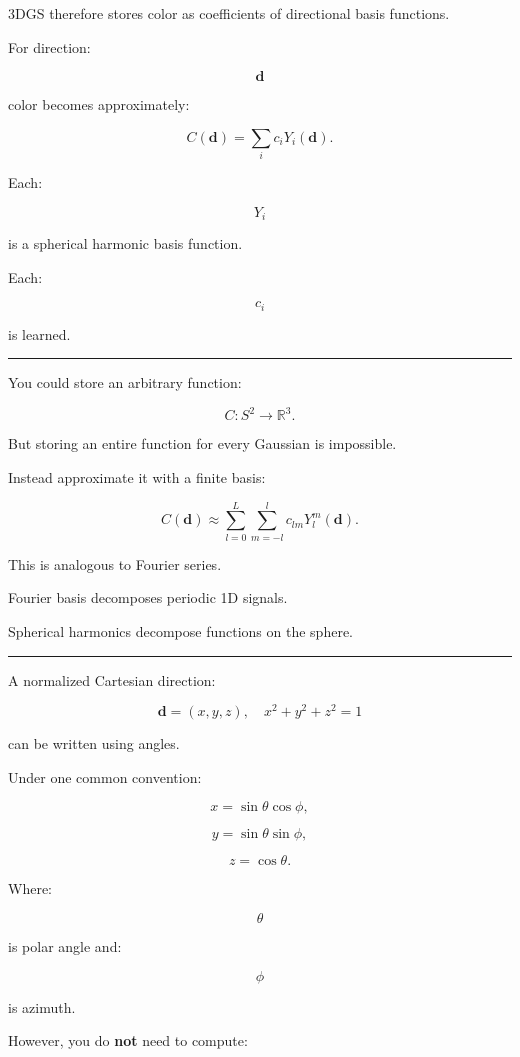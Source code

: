 3DGS therefore stores color as coefficients of directional basis functions.

For direction:

\[
\mathbf d
\]

color becomes approximately:

\[
\boxed{
C(\mathbf d)
=
\sum_i
c_iY_i(\mathbf d).
}
\]

Each:

\[
Y_i
\]

is a spherical harmonic basis function.

Each:

\[
c_i
\]

is learned.

\begin{center}\rule{0.5\linewidth}{0.5pt}\end{center}

You could store an arbitrary function:

\[
C:S^2\rightarrow\mathbb R^3.
\]

But storing an entire function for every Gaussian is impossible.

Instead approximate it with a finite basis:

\[
C(\mathbf d)
\approx
\sum_{l=0}^{L}
\sum_{m=-l}^{l}
c_{lm}
Y_l^m(\mathbf d).
\]

This is analogous to Fourier series.

Fourier basis decomposes periodic 1D signals.

Spherical harmonics decompose functions on the sphere.

\begin{center}\rule{0.5\linewidth}{0.5pt}\end{center}

A normalized Cartesian direction:

\[
\mathbf d=
(x,y,z),
\quad
x^2+y^2+z^2=1
\]

can be written using angles.

Under one common convention:

\[
x=\sin\theta\cos\phi,
\]

\[
y=\sin\theta\sin\phi,
\]

\[
z=\cos\theta.
\]

Where:

\[
\theta
\]

is polar angle and:

\[
\phi
\]

is azimuth.

However, you do \textbf{not} need to compute:

